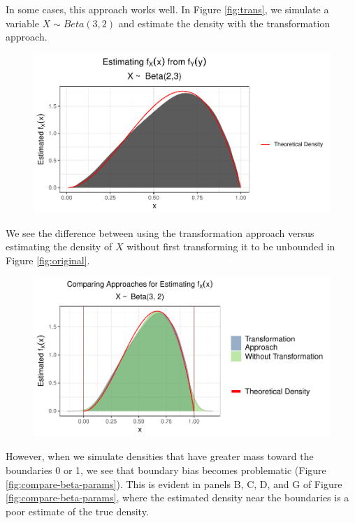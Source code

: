 \documentclass[12pt,twoside]{smiththesis}
\begin{document}
In some cases, this approach works well. In Figure \ref{fig:trans}, we simulate a variable \(X \sim Beta(3,2)\) and estimate the density with the transformation approach.
\begin{figure}

{\centering \includegraphics[width=1\linewidth]{thesis_files/figure-latex/unnamed-chunk-41-1} 

}

\caption{\label{fig:trans}}\label{fig:unnamed-chunk-41}
\end{figure}
We see the difference between using the transformation approach versus estimating the density of \(X\) without first transforming it to be unbounded in Figure \ref{fig:original}.
\begin{figure}

{\centering \includegraphics[width=1\linewidth]{thesis_files/figure-latex/create-fig-original-1} 

}

\caption{\label{fig:original}}\label{fig:create-fig-original}
\end{figure}
However, when we simulate densities that have greater mass toward the boundaries 0 or 1, we see that boundary bias becomes problematic (Figure \ref{fig:compare-beta-params}). This is evident in panels B, C, D, and G of Figure \ref{fig:compare-beta-params}, where the estimated density near the boundaries is a poor estimate of the true density.
\end{document}
